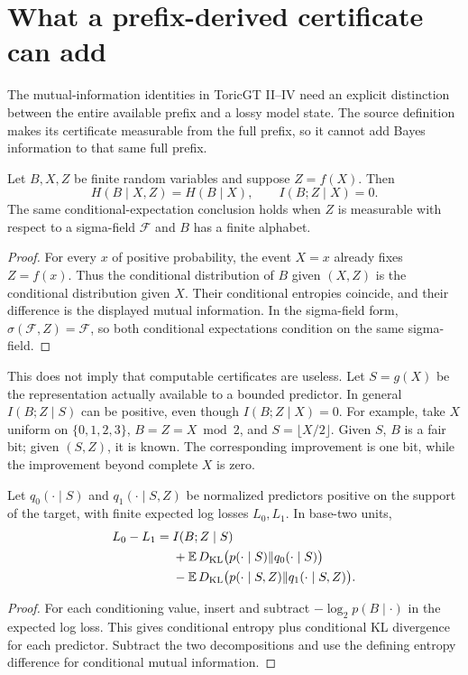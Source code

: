 \section{What a prefix-derived certificate can add}

The mutual-information identities in ToricGT II--IV need an explicit
distinction between the entire available prefix and a lossy model state.
The source definition makes its certificate measurable from the full
prefix, so it cannot add Bayes information to that same full prefix.

\begin{proposition}
Let $B,X,Z$ be finite random variables and suppose $Z=f(X)$. Then
\[
 H(B\mid X,Z)=H(B\mid X),\qquad I(B;Z\mid X)=0.
\]
The same conditional-expectation conclusion holds when $Z$ is measurable
with respect to a sigma-field $\mathcal F$ and $B$ has a finite alphabet.
\end{proposition}
\begin{proof}
For every $x$ of positive probability, the event $X=x$ already fixes
$Z=f(x)$. Thus the conditional distribution of $B$ given $(X,Z)$ is the
conditional distribution given $X$. Their conditional entropies coincide,
and their difference is the displayed mutual information. In the sigma-field
form, $\sigma(\mathcal F,Z)=\mathcal F$, so both conditional expectations
condition on the same sigma-field.
\end{proof}

This does not imply that computable certificates are useless. Let
$S=g(X)$ be the representation actually available to a bounded predictor.
In general $I(B;Z\mid S)$ can be positive, even though
$I(B;Z\mid X)=0$. For example, take $X$ uniform on $\{0,1,2,3\}$,
$B=Z=X\bmod2$, and $S=\lfloor X/2\rfloor$. Given $S$, $B$ is a fair bit;
given $(S,Z)$, it is known. The corresponding improvement is one bit, while
the improvement beyond complete $X$ is zero.

\begin{proposition}
Let $q_0(\cdot\mid S)$ and $q_1(\cdot\mid S,Z)$ be normalized predictors
positive on the support of the target, with finite expected log losses
$L_0,L_1$. In base-two units,
\begin{align*}
 L_0-L_1={}&I(B;Z\mid S)\\
 &+\mathbb E\,D_{\rm KL}\bigl(p(\cdot\mid S)\|q_0(\cdot\mid S)\bigr)\\
 &-\mathbb E\,D_{\rm KL}\bigl(p(\cdot\mid S,Z)\|q_1(\cdot\mid S,Z)\bigr).
\end{align*}
\end{proposition}
\begin{proof}
For each conditioning value, insert and subtract $-\log_2p(B\mid\cdot)$
in the expected log loss. This gives conditional entropy plus conditional
KL divergence for each predictor. Subtract the two decompositions and use
the defining entropy difference for conditional mutual information.
\end{proof}

